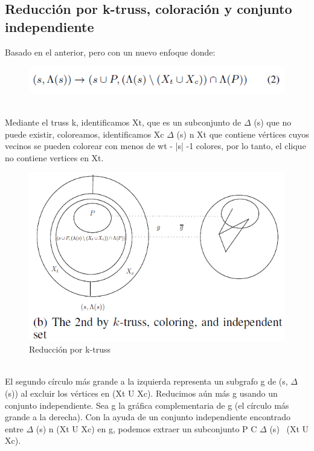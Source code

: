 \subsection{Reducción por k-truss, coloración y conjunto independiente}
Basado en el anterior, pero con un nuevo enfoque donde:
\\
\begin{figure}[h!]
\centering
\includegraphics[scale=1]{img/imagen5.png}
\label{Comandos}
\end{figure}
\\
Mediante el truss k, identificamos Xt, que es un subconjunto de \begin{math}\Delta\end{math} (s) que no puede existir, coloreamos, identificamos Xc \begin{math}\Delta\end{math} (s) n Xt que contiene vértices cuyos vecinos se pueden colorear con menos de wt - |s| -1 colores, por lo tanto, el clique no contiene vertices en Xt.
\\
\begin{figure}[h!]
\centering
\includegraphics[scale=1.1]{img/imagen6.png}
\caption{Reducción por k-truss}
\label{Comandos}
\end{figure}
\\
El segundo círculo más grande a la izquierda representa un subgrafo g de (s, \begin{math}\Delta\end{math} (s)) al excluir los vértices en (Xt U Xc). Reducimos aún más g usando un conjunto independiente. Sea g la gráfica complementaria de g (el círculo más grande a la derecha). Con la ayuda de un conjunto independiente encontrado entre \begin{math}\Delta\end{math} (s) n (Xt U Xc) en g, podemos extraer un subconjunto P C \begin{math}\Delta\end{math} (s) \ (Xt U Xc).
